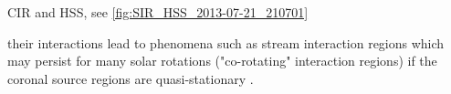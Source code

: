CIR and HSS, see \autoref{fig:SIR_HSS_2013-07-21_210701}\\
\begin{figure}[htb]
\end{figure}

their interactions lead to phenomena such as stream interaction regions which may persist for many solar rotations ("co-rotating" interaction regions) if the coronal source regions are quasi-stationary \citep{Balogh1999}.\\



